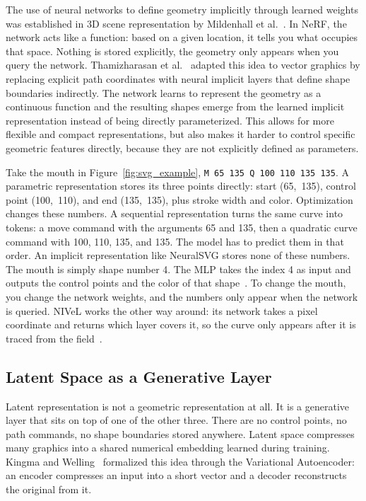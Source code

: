 The use of neural networks to define geometry implicitly 
through learned weights was established in 
3D scene representation by Mildenhall et 
al.~\cite{mildenhallNeRFRepresentingScenes2020}. In NeRF,
the network acts like a function: based on a given location,
it tells you what occupies that 
space. Nothing is stored explicitly, the geometry 
only appears when you query the network.
Thamizharasan et 
al.~\cite{thamizharasanNIVeLNeuralImplicit2024} adapted this 
idea to vector graphics by replacing explicit path coordinates 
with neural implicit layers that define shape boundaries 
indirectly. The network learns to represent the geometry as a continuous 
function and the resulting shapes emerge from the learned implicit representation 
instead of being directly parameterized. This allows for more flexible and 
compact representations, but also makes it harder to control specific 
geometric features directly, because they are not explicitly defined as 
parameters.   

Take the mouth 
in Figure~\ref{fig:svg_example}, \texttt{M 65 135 Q 100 110 135 135}. 
A parametric representation stores its three points directly: start 
(65,~135), control point (100,~110), and end (135,~135), plus stroke 
width and color. Optimization changes these numbers. A sequential 
representation turns the same curve into tokens: a move command with 
the arguments 65 and 135, then a quadratic curve command with 100, 110, 
135, and 135. The model has to predict them in that order. An implicit 
representation like NeuralSVG stores none of these numbers. The mouth 
is simply shape number 4. The MLP takes the index 4 as input and 
outputs the control points and the color of that 
shape~\cite{polaczekNeuralSVGImplicitRepresentation2025}. To change 
the mouth, you change the network weights, and the numbers only appear 
when the network is queried. NIVeL works the other way around: its network 
takes a pixel coordinate and returns which layer covers it, so the 
curve only appears after it is traced from the 
field~\cite{thamizharasanNIVeLNeuralImplicit2024}.


\subsection{Latent Space as a Generative Layer}
\label{sec:latent_repr}

Latent representation is not a geometric representation at all. 
It is a generative layer that sits on top of one of the other three.
There are no control points, no path commands, no shape boundaries 
stored anywhere. Latent space compresses many graphics
into a shared numerical embedding learned during training. 
Kingma and Welling~\cite{kingmaAutoEncodingVariationalBayes2022} 
formalized this idea through the Variational Autoencoder: 
an encoder compresses an input into a short vector and a 
decoder reconstructs the original from it.

